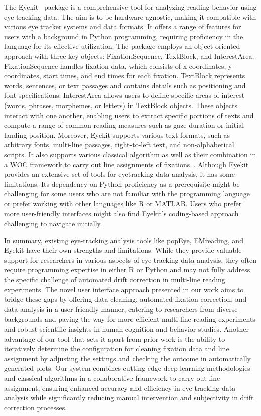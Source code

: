 \documentclass[twocolumn]{article}
\begin{document}
The Eyekit~\cite{carrEyekit2019} package is a comprehensive tool for analyzing reading behavior using eye tracking data. The aim is to be hardware-agnostic, making it compatible with various eye tracker systems and data formats. It offers a range of features for users with a background in Python programming, requiring proficiency in the language for its effective utilization. The package employs an object-oriented approach with three key objects: FixationSequence, TextBlock, and InterestArea. FixationSequence handles fixation data, which consists of x-coordinates, y-coordinates, start times, and end times for each fixation. TextBlock represents words, sentences, or text passages and contains details such as positioning and font specifications. InterestArea allows users to define specific areas of interest (words, phrases, morphemes, or letters) in TextBlock objects. These objects interact with one another, enabling users to extract specific portions of texts and compute a range of common reading measures such as gaze duration or initial landing position. Moreover, Eyekit supports various text formats, such as arbitrary fonts, multi-line passages, right-to-left text, and non-alphabetical scripts. It also supports various classical algorithm as well as their combination in a WOC framework to carry out line assignments of fixations~\cite{carrAlgorithmsAutomatedCorrection2022}. Although Eyekit provides an extensive set of tools for eyetracking data analysis, it has some limitations. Its dependency on Python proficiency as a prerequisite might be challenging for some users who are not familiar with the programming language or prefer working with other languages like R or MATLAB. Users who prefer more user-friendly interfaces might also find Eyekit's coding-based approach challenging to navigate initially.

In summary, existing eye-tracking analysis tools like popEye, EMreading, and Eyekit have their own strengths and limitations. While they provide valuable support for researchers in various aspects of eye-tracking data analysis, they often require programming expertise in either R or Python and may not fully address the specific challenge of automated drift correction in multi-line reading experiments. The novel user interface approach presented in our work aims to bridge these gaps by offering data cleaning, automated fixation correction, and data analysis in a user-friendly manner, catering to researchers from diverse backgrounds and paving the way for more efficient multi-line reading experiments and robust scientific insights in human cognition and behavior studies. Another advantage of our tool that sets it apart from prior work is the ability to iteratively determine the configuration for cleaning fixation data and line assignment by adjusting the settings and checking the outcome in automatically generated plots. Our system combines cutting-edge deep learning methodologies and classical algorithms in a collaborative framework to carry out line assignment, ensuring enhanced accuracy and efficiency in eye-tracking data analysis while significantly reducing manual intervention and subjectivity in drift correction processes.
\end{document}

